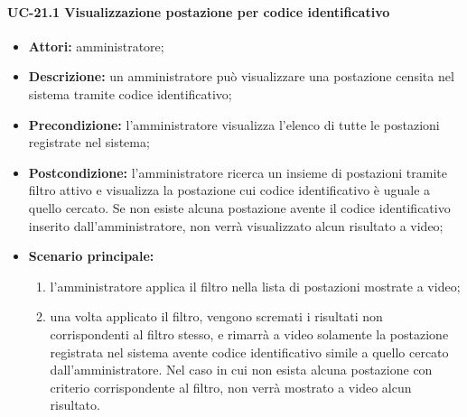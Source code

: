 \paragraph{UC-21.1 Visualizzazione postazione per codice identificativo}
\begin{itemize}
    \item \textbf{Attori:} amministratore;
    \item \textbf{Descrizione:} un amministratore pu\`{o} visualizzare una postazione censita nel sistema tramite codice identificativo;
    \item \textbf{Precondizione:} l'amministratore visualizza l'elenco di tutte le postazioni registrate nel sistema;
    \item \textbf{Postcondizione:} l'amministratore ricerca un insieme di postazioni tramite filtro attivo e visualizza la postazione cui codice identificativo è uguale a quello cercato. Se non esiste alcuna postazione avente il codice identificativo inserito dall'amministratore, non verrà visualizzato alcun risultato a video;
    \item \textbf{Scenario principale:}
    \begin{enumerate}
        \item l'amministratore applica il filtro nella lista di postazioni mostrate a video;
        \item una volta applicato il filtro, vengono scremati i risultati non corrispondenti al filtro stesso, e rimarrà a video solamente la postazione registrata nel sistema avente codice identificativo simile a quello cercato dall'amministratore. Nel caso in cui non esista alcuna postazione con criterio corrispondente al filtro, non verrà mostrato a video alcun risultato.
    \end{enumerate}
\end{itemize}


